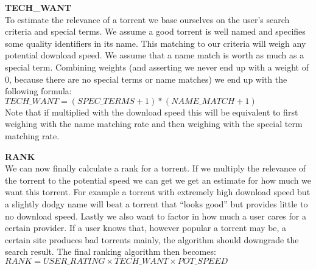 \documentclass[a4paper,11pt]{article}
\begin{document}
\textbf{TECH\_WANT}\\
To estimate the relevance of a torrent we base ourselves on the user's search criteria and special terms.
We assume a good torrent is well named and specifies some quality identifiers in its name.
This matching to our criteria will weigh any potential download speed.
We assume that a name match is worth as much as a special term.
Combining weights (and asserting we never end up with a weight of 0, because there are no special terms
or name matches) we end up with the following formula:\\
$TECH\_WANT = (SPEC\_TERMS + 1) * (NAME\_MATCH + 1)$\\
Note that if multiplied with the download speed this will be equivalent to first weighing with the 
name matching rate and then weighing with the special term matching rate.

\textbf{RANK}\\
We can now finally calculate a rank for a torrent.
If we multiply the relevance of the torrent to the potential speed we can get we get an estimate for how
much we want this torrent. For example a torrent with extremely high download speed but a slightly
dodgy name will beat a torrent that ``looks good'' but provides little to no download speed.
Lastly we also want to factor in how much a user cares for a certain provider.
If a user knows that, however popular a torrent may be, a certain site produces bad torrents mainly, the
algorithm should downgrade the search result.
The final ranking algorithm then becomes:\\
$RANK = USER\_RATING \times TECH\_WANT \times POT\_SPEED$
\end{document}
